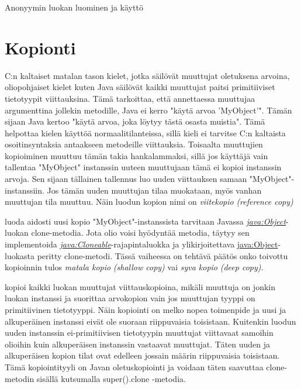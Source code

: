 \documentclass{tufte-book}
\newcommand{\eng}[1]{\textit{(#1)}}
\newcommand{\new}[1]{\textit{\gls{#1}}}
\newcommand{\neweng}[2]{\new{#1} \eng{#2}}
\newcommand{\java}[1]{\underline{\gls{java:#1}}}
\newcommand{\newjava}[1]{\textit{\java{#1}}}
\newcommand{\code}[3]{
\begin{listing}
    \inputminted{java}{OhjelmointiopasEsimerkit/src/#1/#2.java}
    \caption{#3}
    \label{Java-#1-#2}
\end{listing}
}
\begin{document}
\code{week11/anonymousclassexample}{AnonymousClassesExample}{Anonyymin luokan luominen ja käyttö}


\section{Kopionti}
\label{copying}

 C:n kaltaiset matalan tason kielet, jotka säilövät muuttujat oletuksena
arvoina, oliopohjaiset kielet kuten Java säilövät kaikki muuttujat paitsi primitiiviset
tietotyypit viittauksina. Tämä tarkoittaa, että annettaessa muuttujaa argumenttina jollekin
metodille, Java ei kerro "käytä arvoa 'MyObject'". Tämän sijaan Java kertoo "käytä arvoa, joka
löytyy tästä osasta muistia". Tämä helpottaa kielen käyttöä normaalitilanteissa, sillä kieli ei
tarvitse C:n kaltaista osoitinsyntaksia antaakseen metodeille viittauksia. Toisaalta muuttujien
kopioiminen muuttuu tämän takia hankalammaksi, sillä jos käyttäjä vain tallentaa "MyObject"
instanssin uuteen muuttujaan tämä ei kopioi instanssin arvoja. Sen sijaan tällainen tallennus luo
uuden viittauksen samaan "MyObject"-instanssiin. Jos tämän uuden muuttujan tilaa muokataan, myös
vanhan muuttujan tila muuttuu. Näin luodun kopion nimi on \neweng{viitekopio}{reference copy}


 luoda aidosti uusi kopio "MyObject"-instanssista tarvitaan Javassa
\newjava{Object}-luokan clone-metodia. Jota olio voisi hyödyntää metodia, täytyy sen implementoida
\newjava{Cloneable}-rajapintaluokka ja ylikirjoitettava \java{Object}-luokasta peritty
clone-metodi. Tässä vaiheessa on tehtävä päätös onko toivottu kopioinnin tulos \neweng{matala
kopio}{shallow copy} vai \neweng{syva kopio}{deep copy}. 

 kopioi kaikki luokan muuttujat viittauskopioina, mikäli muuttuja
on jonkin luokan instanssi ja suorittaa arvokopion vain jos muuttujan tyyppi on primitiivinen
tietotyyppi. Näin kopiointi on melko nopea toimenpide ja uusi ja alkuperäinen instanssi eivät ole
suoraan riippuvaisia toisistaan. Kuitenkin luodun uuden instanssin ei-primitiivisen tietotyypin
muuttujat viittavaat samoihin olioihin kuin alkuperäisen instanssin vastaavat muuttujat. Täten
uuden ja alkuperäisen kopion tilat ovat edelleen jossain määrin riippuvaisia toisistaan. Tämä
kopiointityyli on Javan oletuskopiointi ja voidaan täten saavuttaa clone-metodin sisällä
kutsumalla super().clone -metodia.
\end{document}
